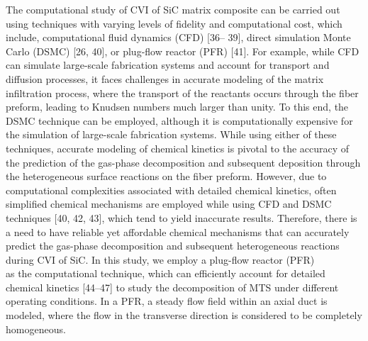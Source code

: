 \documentclass[10pt, letterpaper]{article}
\begin{document}
The computational study of CVI of SiC matrix composite can be carried out using techniques with
varying levels of fidelity and computational cost, which include, computational fluid dynamics (CFD) [36–
39], direct simulation Monte Carlo (DSMC) [26, 40], or plug-flow reactor (PFR) [41]. For example, while
CFD can simulate large-scale fabrication systems and account for transport and diffusion processes, it faces
challenges in accurate modeling of the matrix infiltration process, where the transport of the reactants
occurs through the fiber preform, leading to Knudsen numbers much larger than unity. To this end, the
DSMC technique can be employed, although it is computationally expensive for the simulation of large-scale
fabrication systems. While using either of these techniques, accurate modeling of chemical kinetics is pivotal
to the accuracy of the prediction of the gas-phase decomposition and subsequent deposition through the
heterogeneous surface reactions on the fiber preform. However, due to computational complexities associated
with detailed chemical kinetics, often simplified chemical mechanisms are employed while using CFD and
DSMC techniques [40, 42, 43], which tend to yield inaccurate results. Therefore, there is a need to have
reliable yet affordable chemical mechanisms that can accurately predict the gas-phase decomposition and
subsequent heterogeneous reactions during CVI of SiC. In this study, we employ a plug-flow reactor (PFR)
\\
as the computational technique, which can efficiently account for detailed chemical kinetics [44–47] to study
the decomposition of MTS under different operating conditions. In a PFR, a steady flow field within an axial
duct is modeled, where the flow in the transverse direction is considered to be completely homogeneous.
\end{document}
